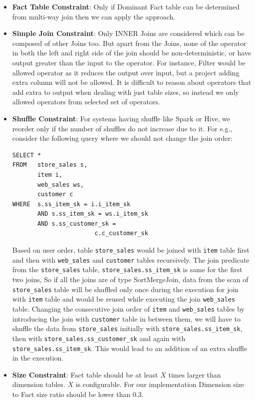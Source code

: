 \begin{itemize}
\item \textbf{Fact Table Constraint}: Only if Dominant Fact table can be determined from multi-way join then we can apply the approach.
\item \textbf{Simple Join Constraint}: Only INNER Joins are considered which can be composed of other Joins too. But apart from the Joins, none of the operator in both the left and right side of the join should be non-deterministic, or have output greater than the input to the operator. For instance, Filter would be allowed operator as it reduces the output over input, but a project adding extra column will not be allowed. It is difficult to reason about operators that add extra to output when dealing with just table sizes, so instead we only allowed operators from selected set of operators.
\item \textbf{Shuffle Constraint}: For systems having shuffle like Spark or Hive, we reorder only if the number of shuffles do not increase due to it. For e.g., consider the following query where we should not change the join order: 
\begin{verbatim}
SELECT * 
FROM   store_sales s, 
       item i, 
       web_sales ws, 
       customer c 
WHERE  s.ss_item_sk = i.i_item_sk 
       AND s.ss_item_sk = ws.i_item_sk 
       AND s.ss_customer_sk = 
                       c.c_customer_sk
\end{verbatim}

Based on user order, table \texttt{store\_sales} would be joined with \texttt{item} table first and then with \texttt{web\_sales} and \texttt{customer} tables recursively. The join predicate from the \texttt{store\_sales} table, \texttt{store\_sales.ss\_item\_sk} is same for the first two joins, So if all the joins are of type SortMergeJoin, data from the scan of \texttt{store\_sales} table will be shuffled only once during the execution for join with \texttt{item} table and would be reused while executing the join \texttt{web\_sales} table. Changing the consecutive join order of \texttt{item} and \texttt{web\_sales} tables by introducing the join with \texttt{customer} table in between them, we will have to shuffle the data from \texttt{store\_sales} initially with \texttt{store\_sales.ss\_item\_sk}, then with \texttt{store\_sales.ss\_customer\_sk} and again with   \texttt{store\_sales.ss\_item\_sk}. This would lead to an addition of an extra shuffle in the execution.
\item \textbf{Size Constraint}: Fact table should be at least $X$ times larger than dimension tables. $X$ is configurable. For our implementation Dimension size to Fact size  ratio should be lower than 0.3.
\end{itemize}


